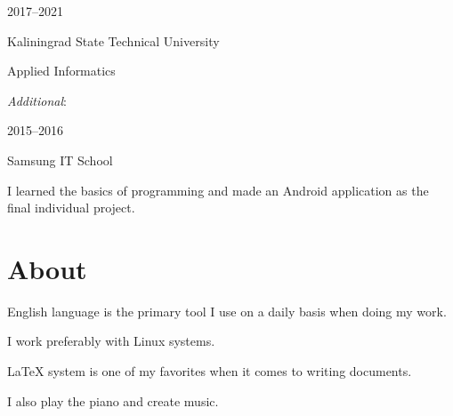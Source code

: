 \documentclass [12pt] {article}
\begin{document}
2017--2021

Kaliningrad State Technical University

Applied Informatics

\bigskip

\emph {Additional}:

2015--2016

Samsung IT School

I learned the basics of programming
and made an Android application as the final individual project.

\section {About}

English language is the primary tool
I use on a daily basis when doing my work.

I work preferably with Linux systems.

LaTeX system is one of my favorites
when it comes to writing documents.

I also play the piano and create music.
\end{document}
